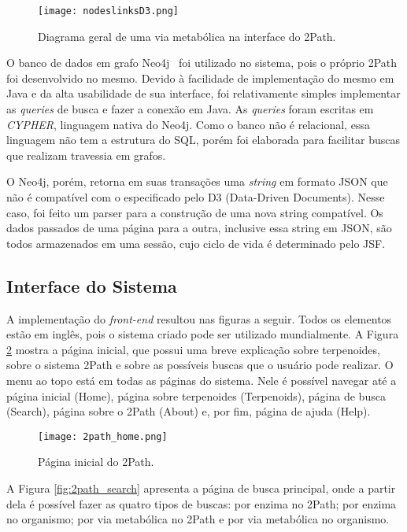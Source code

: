 \begin{figure}[!h]
    \centering
    \texttt{[image: nodeslinksD3.png]}
    \caption{Diagrama geral de uma via metabólica na interface do 2Path.}
    \label{fig:nodeslinksD3}
\end{figure}

\indent O banco de dados em grafo Neo4j~\cite{waldeyr} foi utilizado no sistema, pois o próprio 2Path foi desenvolvido no mesmo. Devido à facilidade de implementação do mesmo em Java e da alta usabilidade de sua interface, foi relativamente simples implementar as \textit{queries} de busca e fazer a conexão em Java. As \textit{queries} foram escritas em \textit{CYPHER}, linguagem nativa do Neo4j. Como o banco não é relacional, essa linguagem não tem a estrutura do SQL, porém foi elaborada para facilitar buscas que realizam travessia em grafos. 

\indent O Neo4j, porém, retorna em suas transações uma \textit{string} em formato JSON que não é compatível com o especificado pelo D3 (Data-Driven Documents). Nesse caso, foi feito um parser para a construção de uma nova string compatível. Os dados passados de uma página para a outra, inclusive essa string em JSON, são todos armazenados em uma sessão, cujo ciclo de vida é determinado pelo JSF.

\subsection{Interface do Sistema}

\indent A implementação do \textit{front-end} resultou nas figuras a seguir. Todos os elementos estão em inglês, pois o sistema criado pode ser utilizado mundialmente. A Figura \ref{fig:2path_home} mostra a página inicial, que possui uma breve explicação sobre terpenoides, sobre o sistema 2Path e sobre as possíveis buscas que o usuário pode realizar. O menu ao topo está em todas as páginas do sistema. Nele é possível navegar até a página inicial (Home), página sobre terpenoides (Terpenoids), página de busca (Search), página sobre o 2Path (About) e, por fim, página de ajuda (Help).

\begin{figure}[!h]
    \centering
    \texttt{[image: 2path\_home.png]}
    \caption{Página inicial do 2Path.}
    \label{fig:2path_home}
\end{figure}

\indent A Figura \ref{fig:2path_search} apresenta a página de busca principal, onde a partir dela é possível fazer as quatro tipos de buscas: por enzima no 2Path; por enzima no organismo; por via metabólica no 2Path e por via metabólica no organismo.

